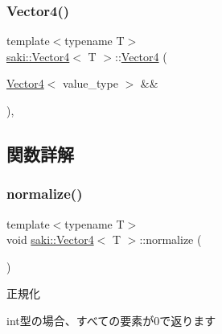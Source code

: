 \mbox{\label{classsaki_1_1_vector4_a52a0d7f95e04f19c6e9f00116e4af550}} 
\subsubsection{\texorpdfstring{Vector4()}{Vector4()}\hspace{0.1cm}{\footnotesize\ttfamily [5/5]}}
{\footnotesize\ttfamily template$<$typename T$>$ \\
\mbox{\hyperlink{classsaki_1_1_vector4}{saki\+::\+Vector4}}$<$ T $>$\+::\mbox{\hyperlink{classsaki_1_1_vector4}{Vector4}} (\begin{DoxyParamCaption}\item[{\mbox{\hyperlink{classsaki_1_1_vector4}{Vector4}}$<$ value\+\_\+type $>$ \&\&}]{ }\end{DoxyParamCaption})\hspace{0.3cm}{\ttfamily [default]}, {\ttfamily [noexcept]}}



\subsection{関数詳解}
\mbox{\label{classsaki_1_1_vector4_a0dffdb9814b980692e096cfca3438665}} 
\subsubsection{\texorpdfstring{normalize()}{normalize()}}
{\footnotesize\ttfamily template$<$typename T$>$ \\
void \mbox{\hyperlink{classsaki_1_1_vector4}{saki\+::\+Vector4}}$<$ T $>$\+::normalize (\begin{DoxyParamCaption}{ }\end{DoxyParamCaption})\hspace{0.3cm}{\ttfamily [inline]}}



正規化 

int型の場合、すべての要素が0で返ります \mbox{\label{classsaki_1_1_vector4_a0d2783b04b8c25139339345eacedd2d6}} 

